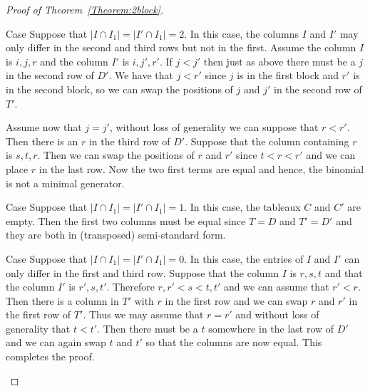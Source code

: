 \begin{proof}[Proof of Theorem~\ref{Theorem:2block}]
\begin{enonce}[remark]{Case}\label{Case2}%
Suppose that $| I \cap I_1 | = |I' \cap I_1| =2$. In this case, the columns $I$ and $I'$ may only differ in the second and third rows but not in the first. Assume the column $I$ is $i, j, r$ and the column $I'$ is $i, j', r'$. If $j <j'$ then just as above there must be a $j$ in the second row of $D'$. We have that $j <r'$ since $j$ is in the first block and $r'$ is in the second block, so we can swap the positions of $j $ and $j'$ in the second row of $T'$. 

Assume now that $j = j'$, without loss of generality we can suppose that $r<r'$. Then there is an $r$ in the third row of $D'$. Suppose that the column containing $r$ is $s, t, r$. Then we can swap the positions of $r$ and $r'$ since $t<r<r'$ and we can place $r$ in the last row. Now the two first terms are equal and hence, the binomial is not a minimal generator.
\end{enonce}

\begin{enonce}[remark]{Case}\label{Case3}%
Suppose that $| I \cap I_1 | = |I' \cap I_1| = 1$. In this case, the tableaux $C$ and $C'$ are empty. Then the first two columns must be equal since $T = D$ and $T'= D'$ and they are both in (transposed) semi-standard form. 
\end{enonce}

\begin{enonce}[remark]{Case}\label{Case4}\setcounter{cdrthm}{4}
Suppose that $| I \cap I_1 | = |I' \cap I_1| =0$. In this case, the entries of $I$ and $I'$ can only differ in the first and third row. Suppose that the column $I$ is $r, s, t$ and that the column $I'$ is $r', s, t'$. 
Therefore $r, r'<s<t, t'$ and we can assume that $r' <r$. 
Then there is a column in $T'$ with $r$ in the first row and we can swap $r$ and $r'$ in the first row of $T'$. 
Thus we may assume that $r = r'$ and without loss of generality that $t < t'$. Then there must be a $t$ somewhere in the last row of $D'$ and we can again swap $t$ and $t'$ so that the columns are now equal. This completes the proof. \qedhere
\end{enonce}
\end{proof}
